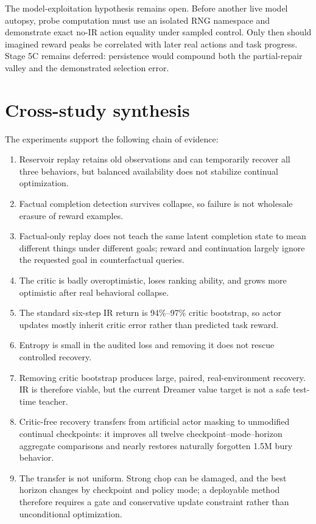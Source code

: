 \documentclass[10pt]{article}
\newcommand{\pct}[1]{#1\%}
\begin{document}
The model-exploitation hypothesis remains open. Before another live model
autopsy, probe computation must use an isolated RNG namespace and demonstrate
exact no-IR action equality under sampled control. Only then should imagined
reward peaks be correlated with later real actions and task progress. Stage 5C
remains deferred: persistence would compound both the partial-repair valley
and the demonstrated selection error.

\section{Cross-study synthesis}

The experiments support the following chain of evidence:
\begin{enumerate}
  \item Reservoir replay retains old observations and can temporarily recover all three behaviors, but balanced availability does not stabilize continual optimization.
  \item Factual completion detection survives collapse, so failure is not wholesale erasure of reward examples.
  \item Factual-only replay does not teach the same latent completion state to mean different things under different goals; reward and continuation largely ignore the requested goal in counterfactual queries.
  \item The critic is badly overoptimistic, loses ranking ability, and grows more optimistic after real behavioral collapse.
  \item The standard six-step IR return is \pct{94}--\pct{97} critic bootstrap, so actor updates mostly inherit critic error rather than predicted task reward.
  \item Entropy is small in the audited loss and removing it does not rescue controlled recovery.
  \item Removing critic bootstrap produces large, paired, real-environment recovery. IR is therefore viable, but the current Dreamer value target is not a safe test-time teacher.
  \item Critic-free recovery transfers from artificial actor masking to unmodified continual checkpoints: it improves all twelve checkpoint--mode--horizon aggregate comparisons and nearly restores naturally forgotten 1.5M bury behavior.
  \item The transfer is not uniform. Strong chop can be damaged, and the best horizon changes by checkpoint and policy mode; a deployable method therefore requires a gate and conservative update constraint rather than unconditional optimization.

\end{enumerate}
\end{document}
